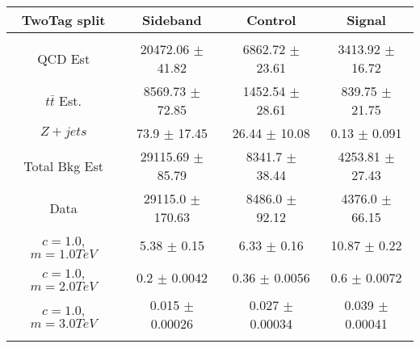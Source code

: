 \begin{footnotesize} 
\begin{tabular}{c|c|c|c} 
TwoTag split & Sideband & Control & Signal \\ 
\hline\hline 
& & & \\ 
QCD Est & 20472.06 $\pm$ 41.82 & 6862.72 $\pm$ 23.61 & 3413.92 $\pm$ 16.72\\ 
$t\bar{t}$ Est.  & 8569.73 $\pm$ 72.85 & 1452.54 $\pm$ 28.61 & 839.75 $\pm$ 21.75\\ 
$Z+jets$ & 73.9 $\pm$ 17.45 & 26.44 $\pm$ 10.08 & 0.13 $\pm$ 0.091\\ 
Total Bkg Est & 29115.69 $\pm$ 85.79 & 8341.7 $\pm$ 38.44 & 4253.81 $\pm$ 27.43\\ 
Data & 29115.0 $\pm$ 170.63 & 8486.0 $\pm$ 92.12 & 4376.0 $\pm$ 66.15\\ 
$c=1.0$,$m=1.0TeV$ & 5.38 $\pm$ 0.15 & 6.33 $\pm$ 0.16 & 10.87 $\pm$ 0.22\\ 
$c=1.0$,$m=2.0TeV$ & 0.2 $\pm$ 0.0042 & 0.36 $\pm$ 0.0056 & 0.6 $\pm$ 0.0072\\ 
$c=1.0$,$m=3.0TeV$ & 0.015 $\pm$ 0.00026 & 0.027 $\pm$ 0.00034 & 0.039 $\pm$ 0.00041\\ 
& & & \\ 
\hline\hline 
\end{tabular} 
\end{footnotesize} 
\newline 
